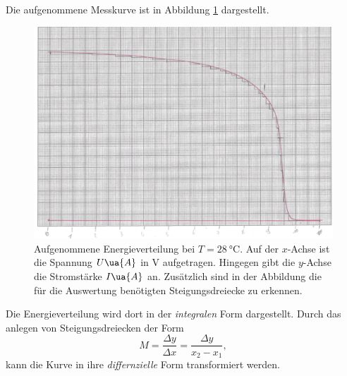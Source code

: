 Die aufgenommene Messkurve ist in Abbildung \ref{fig: messkurve_energie_zim} dargestellt.
\begin{figure}
  \centering
  \includegraphics[width=0.8 \textwidth]{./pics/energieverteilung_zimmer.png}
  \caption{Aufgenommene Energieverteilung bei $T=\SI{28}{\celsius}$. Auf der $x$-Achse ist die Spannung $U\ua{A}$ in $\si{\volt}$ aufgetragen.
          Hingegen gibt die $y$-Achse die Stromstärke $I\ua{A}$ an. Zusätzlich sind in der Abbildung die für die Auswertung benötigten Steigungsdreiecke zu erkennen.}
  \label{fig: messkurve_energie_zim}
\end{figure}
Die Energieverteilung wird dort in der \emph{integralen} Form dargestellt.
Durch das anlegen von Steigungsdreiecken der Form
\begin{equation}
  \label{eq:steigung}
    M=\frac{\Delta y}{\Delta x}=\frac{\Delta y}{x_2-x_1},
\end{equation}
kann die Kurve in ihre \emph{differnzielle} Form transformiert werden.

